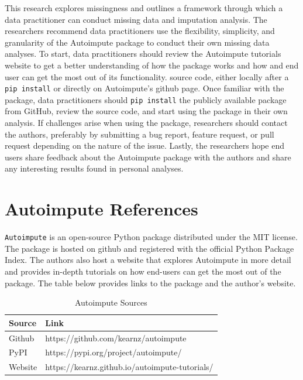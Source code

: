 \documentclass[12pt,oneside]{chicagocapstone}
\begin{document}
This research explores missingness and outlines a framework through
which a data practitioner can conduct missing data and imputation
analysis. The researchers recommend data practitioners use the
flexibility, simplicity, and granularity of the Autoimpute package to
conduct their own missing data analyses. To start, data practitioners
should review the Autoimpute tutorials website to get a better
understanding of how the package works and how and end user can get the
most out of its functionality. source code, either locally after a
\texttt{pip\ install} or directly on Autoimpute's github page. Once
familiar with the package, data practitioners should
\texttt{pip\ install} the publicly available package from GitHub, review
the source code, and start using the package in their own analysis. If
challenges arise when using the package, researchers should contact the
authors, preferably by submitting a bug report, feature request, or pull
request depending on the nature of the issue. Lastly, the researchers
hope end users share feedback about the Autoimpute package with the
authors and share any interesting results found in personal analyses.

\appendix

\chapter{Autoimpute References}\label{autoimpute-references}

\texttt{Autoimpute} is an open-source Python package distributed under
the MIT license. The package is hosted on github and registered with the
official Python Package Index. The authors also host a website that
explores Autoimpute in more detail and provides in-depth tutorials on
how end-users can get the most out of the package. The table below
provides links to the package and the author's website.
\begin{table}[!h]

\caption{\label{tab:appendixa}Autoimpute Sources}
\begin{tabu} to 
\toprule
\begingroup\fontsize{13}{15}\selectfont \textbf{Source}\endgroup & \begingroup\fontsize{13}{15}\selectfont \textbf{Link}\endgroup\\
\midrule
Github & https://github.com/kearnz/autoimpute\\
PyPI & https://pypi.org/project/autoimpute/\\
Website & https://kearnz.github.io/autoimpute-tutorials/\\
\bottomrule
\end{tabu}
\end{table}
\end{document}
